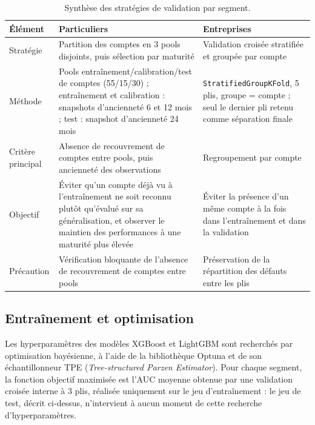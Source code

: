 \begin{table}[htbp]
    \centering
    \footnotesize
    \caption{Synthèse des stratégies de validation par segment.}
    \label{tab:strategies-validation}
    \begin{tabular}{p{2.6cm}p{5.2cm}p{5.2cm}}
        \toprule
        \textbf{Élément} & \textbf{Particuliers} & \textbf{Entreprises} \\
        \midrule
        Stratégie & Partition des comptes en 3 pools disjoints, puis sélection par maturité & Validation croisée stratifiée et groupée par compte \\
        \addlinespace
        Méthode & Pools entraînement/calibration/test de comptes (55/15/30) ; entraînement et calibration : snapshots d'ancienneté 6 et 12 mois ; test : snapshot d'ancienneté 24 mois & \texttt{StratifiedGroupKFold}, 5 plis, groupe = compte ; seul le dernier pli retenu comme séparation finale \\
        \addlinespace
        Critère principal & Absence de recouvrement de comptes entre pools, puis ancienneté des observations & Regroupement par compte \\
        \addlinespace
        Objectif & Éviter qu'un compte déjà vu à l'entraînement ne soit reconnu plutôt qu'évalué sur sa généralisation, et observer le maintien des performances à une maturité plus élevée & Éviter la présence d'un même compte à la fois dans l'entraînement et dans la validation \\
        \addlinespace
        Précaution & Vérification bloquante de l'absence de recouvrement de comptes entre pools & Préservation de la répartition des défauts entre les plis \\
        \bottomrule
    \end{tabular}
\end{table}

\subsection{Entraînement et optimisation}

Les hyperparamètres des modèles XGBoost et LightGBM sont recherchés par optimisation bayésienne, à l'aide de la bibliothèque Optuna et de son échantillonneur TPE (\emph{Tree-structured Parzen Estimator}). Pour chaque segment, la fonction objectif maximisée est l'AUC moyenne obtenue par une validation croisée interne à 3 plis, réalisée uniquement sur le jeu d'entraînement : le jeu de test, décrit ci-dessus, n'intervient à aucun moment de cette recherche d'hyperparamètres.

